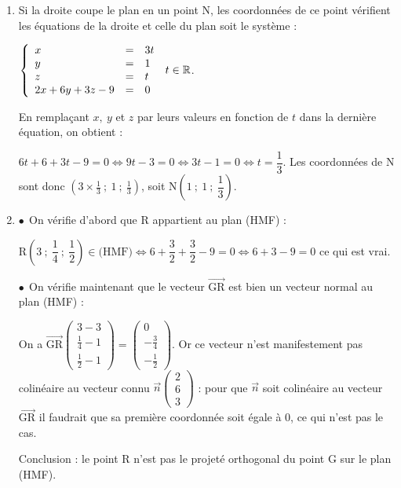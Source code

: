 \documentclass[10pt]{article}
\providecommand{\R}{\mathbb{R}}
\providecommand{\vect}[1]{\overrightarrow{#1}}
\begin{document}
\begin{enumerate}
$X(x~;~y~;~z) \in  (\text{DG}) \iff \vect{\text{DX}} = t\vect{\text{DG}}, \: t \in \R \iff \left\{\begin{array}{l c l}
x - 0&=&3t\\y - 1&=&0\\z - 0 &=& 1t\end{array}\right.\: t \in \R \iff \left\{\begin{array}{l c l}
x &=&3t\\y &=&1\\z  &=& t\end{array}\right.\: t \in \R$.
\item 


Si la droite coupe le plan en un point N, les coordonnées de ce point vérifient les équations de la droite et celle du plan soit le système :

$\left\{\begin{array}{l c l}
x &=&3t\\y &=&1\\z  &=& t\\
2x + 6y + 3z - 9 &= &0
\end{array}\right.\: t \in \R$.

En remplaçant $x,\:y$ et $z$ par leurs valeurs en fonction de $t$ dans la dernière équation, on obtient :

$6t + 6 + 3t - 9 = 0 \iff 9t - 3 = 0 \iff 3t - 1 = 0 \iff t = \dfrac 13$.
Les coordonnées de N sont donc $\left(3\times \frac13~;~1~;~\frac13\right)$, soit 
N$\left(1~;~1~;~\dfrac13\right)$.
\item 
$\bullet~~$On vérifie d'abord que R appartient au plan (HMF) :

$\text{R}\left(3~;~\dfrac{1}{4}~;~\dfrac{1}{2}\right) \in \text{(HMF)} \iff 6 + \dfrac32 + \dfrac32 - 9 = 0 \iff 6 + 3 - 9 = 0$ ce qui est vrai.

$\bullet~~$On vérifie maintenant que le vecteur $\vect{\text{GR}}$ est bien un vecteur normal au plan (HMF) :

On a $\vect{\text{GR}}\begin{pmatrix}3 - 3\\ \frac14 - 1\\ \frac12 - 1\end{pmatrix} = \begin{pmatrix}0\\- \frac34\\- \frac12\end{pmatrix}$.
Or ce vecteur n'est manifestement pas colinéaire au vecteur connu $\vect{n}\begin{pmatrix}2\\6\\3\end{pmatrix}$ : pour que $\vect{n}$ soit colinéaire au vecteur $\vect{\text{GR}}$ il faudrait que sa première coordonnée soit égale à 0, ce qui n'est pas le cas.

Conclusion : le point R n'est pas le projeté orthogonal du point G sur le plan (HMF).
\end{enumerate}
\end{document}
